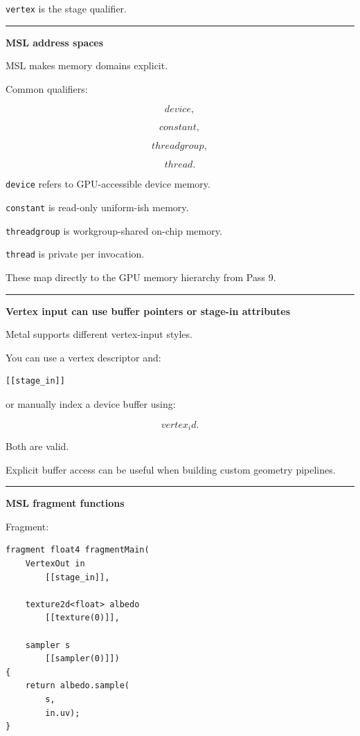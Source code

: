 \texttt{vertex} is the stage qualifier.

\begin{center}\rule{0.5\linewidth}{0.5pt}\end{center}

\textbf{MSL address spaces}

MSL makes memory domains explicit.

Common qualifiers:

\[
device,
\]

\[
constant,
\]

\[
threadgroup,
\]

\[
thread.
\]

\texttt{device} refers to GPU-accessible device memory.

\texttt{constant} is read-only uniform-ish memory.

\texttt{threadgroup} is workgroup-shared on-chip memory.

\texttt{thread} is private per invocation.

These map directly to the GPU memory hierarchy from Pass 9.

\begin{center}\rule{0.5\linewidth}{0.5pt}\end{center}

\textbf{Vertex input can use buffer pointers or stage-in attributes}

Metal supports different vertex-input styles.

You can use a vertex descriptor and:

\begin{verbatim}
[[stage_in]]
\end{verbatim}

or manually index a device buffer using:

\[
vertex_id.
\]

Both are valid.

Explicit buffer access can be useful when building custom geometry pipelines.

\begin{center}\rule{0.5\linewidth}{0.5pt}\end{center}

\textbf{MSL fragment functions}

Fragment:

\begin{verbatim}
fragment float4 fragmentMain(
    VertexOut in
        [[stage_in]],

    texture2d<float> albedo
        [[texture(0)]],

    sampler s
        [[sampler(0)]])
{
    return albedo.sample(
        s,
        in.uv);
}
\end{verbatim}

